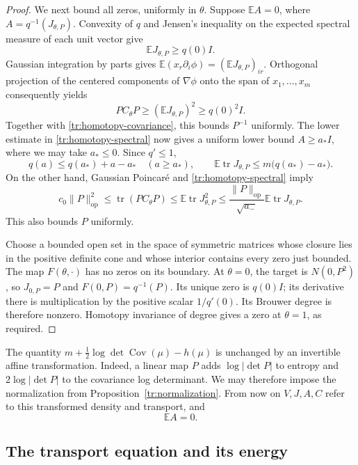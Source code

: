 \documentclass[11pt]{article}
\theoremstyle{definition}
\theoremstyle{remark}
\numberwithin{equation}{section}
\begin{document}
\begin{proof}
We next bound all zeros, uniformly in $\theta$.  Suppose
$\mathbb EA=0$, where $A=q^{-1}(J_{\theta,P})$.  Convexity of $q$
and Jensen's inequality on the expected spectral measure of each unit
vector give
\[
 \mathbb E J_{\theta,P}\ge q(0)I.
\]
Gaussian integration by parts gives
$\mathbb E(x_r\partial_i\phi)=(\mathbb E J_{\theta,P})_{ir}$.
Orthogonal projection of the centered components of $\nabla\phi$
onto the span of $x_1,\ldots,x_m$ consequently yields
\[
 P C_\theta P\ge(\mathbb E J_{\theta,P})^2\ge q(0)^2I.
\]
Together with \eqref{tr:homotopy-covariance}, this bounds $P^{-1}$
uniformly.  The lower estimate in \eqref{tr:homotopy-spectral} now
gives a uniform lower bound $A\ge a_*I$, where we may take $a_*\le0$.
Since $q'\le1$,
\[
 q(a)\le q(a_*)+a-a_*\quad(a\ge a_*),
 \qquad
 \mathbb E\operatorname{tr}J_{\theta,P}
 \le m\bigl(q(a_*)-a_*\bigr).
\]
On the other hand, Gaussian Poincar\'e and
\eqref{tr:homotopy-spectral} imply
\[
 c_0\|P\|_{\mathrm{op}}^2
 \le\operatorname{tr}(P C_\theta P)
 \le\mathbb E\operatorname{tr}J_{\theta,P}^2
 \le\frac{\|P\|_{\mathrm{op}}}{\sqrt{a_-}}
       \mathbb E\operatorname{tr}J_{\theta,P}.
\]
This also bounds $P$ uniformly.

Choose a bounded open set in the space of symmetric matrices whose
closure lies in the positive definite cone and whose interior contains
every zero just bounded.  The map $F(\theta,\cdot)$ has no zeros on its
boundary.  At $\theta=0$, the target is $N(0,P^2)$, so
$J_{0,P}=P$ and $F(0,P)=q^{-1}(P)$.  Its unique zero is $q(0)I$;
its derivative there is multiplication by the positive scalar
$1/q'(0)$.  Its Brouwer degree is therefore nonzero.  Homotopy
invariance of degree gives a zero at $\theta=1$, as required.
\end{proof}

The quantity
$m+\tfrac12\log\det\operatorname{Cov}(\mu)-h(\mu)$ is unchanged
by an invertible affine transformation.  Indeed, a linear map $P$
adds $\log|\det P|$ to entropy and $2\log|\det P|$ to the covariance
log determinant.  We may therefore impose the normalization from
Proposition~\ref{tr:normalization}.  From now on $V,J,A,C$ refer to
this transformed density and transport, and
\begin{equation}\label{tr:mean-zero}
 \mathbb EA=0.
\end{equation}

\subsection{The transport equation and its energy}
\end{document}
